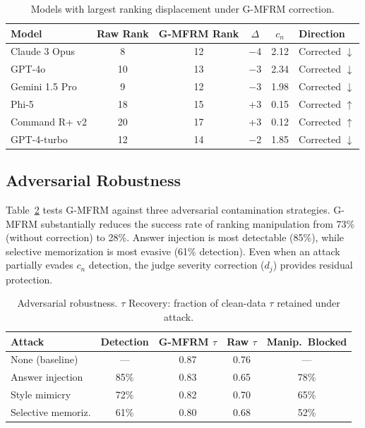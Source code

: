 \documentclass[11pt]{article}
\newcommand{\gmfrm}{\textsc{G-MFRM}}
\newcommand{\cn}{c_n}
\newcommand{\djud}{d_j}
\begin{document}
\begin{table}[t]
\centering
\caption{Models with largest ranking displacement under \gmfrm{} correction.}
\label{tab:rank-change}
\small
\begin{tabular}{@{}lccccl@{}}
\toprule
Model & Raw Rank & \gmfrm{} Rank & $\Delta$ & $\cn$ & Direction \\
\midrule
Claude 3 Opus & 8 & 12 & $-$4 & 2.12 & Corrected $\downarrow$ \\
GPT-4o & 10 & 13 & $-$3 & 2.34 & Corrected $\downarrow$ \\
Gemini 1.5 Pro & 9 & 12 & $-$3 & 1.98 & Corrected $\downarrow$ \\
Phi-5 & 18 & 15 & +3 & 0.15 & Corrected $\uparrow$ \\
Command R+ v2 & 20 & 17 & +3 & 0.12 & Corrected $\uparrow$ \\
GPT-4-turbo & 12 & 14 & $-$2 & 1.85 & Corrected $\downarrow$ \\
\bottomrule
\end{tabular}
\end{table}

\subsection{Adversarial Robustness}

Table~\ref{tab:adversarial} tests \gmfrm{} against three adversarial contamination strategies. \gmfrm{} substantially reduces the success rate of ranking manipulation from 73\% (without correction) to 28\%. Answer injection is most detectable (85\%), while selective memorization is most evasive (61\% detection). Even when an attack partially evades $\cn$ detection, the judge severity correction ($\djud$) provides residual protection.

\begin{table}[t]
\centering
\caption{Adversarial robustness. $\tau$ Recovery: fraction of clean-data $\tau$ retained under attack.}
\label{tab:adversarial}
\small
\begin{tabular}{@{}lcccc@{}}
\toprule
Attack & Detection & \gmfrm{} $\tau$ & Raw $\tau$ & Manip.\ Blocked \\
\midrule
None (baseline) & --- & 0.87 & 0.76 & --- \\
Answer injection & 85\% & 0.83 & 0.65 & 78\% \\
Style mimicry & 72\% & 0.82 & 0.70 & 65\% \\
Selective memoriz. & 61\% & 0.80 & 0.68 & 52\% \\
\bottomrule
\end{tabular}
\end{table}
\end{document}
